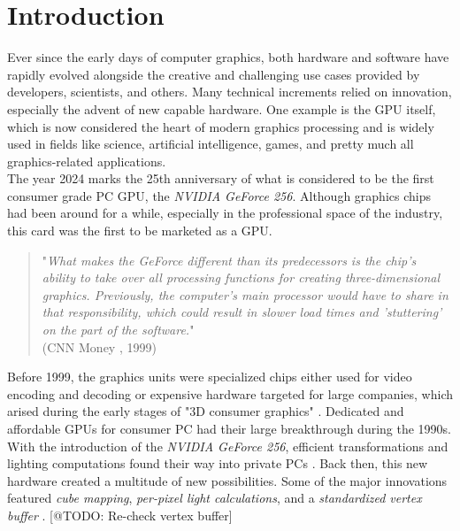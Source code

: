 \chapter{Introduction} \label{cpt-introduction}

Ever since the early days of computer graphics, both hardware and software have rapidly evolved
alongside the creative and challenging use cases provided by developers, scientists, and others.
Many technical increments relied on innovation, especially the advent of new capable hardware.
One example is the \ac{GPU} itself, which is now considered the heart of modern graphics 
processing and is widely used in fields like science, artificial intelligence, games, and pretty 
much all graphics-related applications. \\

\noindent
The year 2024 marks the 25th anniversary of what is considered to be the first consumer grade PC 
\ac{GPU}, the \emph{NVIDIA GeForce 256}. Although graphics chips had been around for a while, 
especially in the professional space of the industry, this card was the first to be marketed 
as a \ac{GPU}. 

\begin{quote}
    "\emph{What makes the GeForce different than its predecessors is the chip's ability to take over all 
    processing functions for creating three-dimensional graphics. Previously, the computer's main 
    processor would have to share in that responsibility, which could result in slower load times 
    and 'stuttering' on the part of the software.}" \\  
    (CNN Money \cite{CNNMoney1999}, 1999)
\end{quote}

\noindent
Before 1999, the graphics units were specialized chips either used for video encoding and decoding
or expensive hardware targeted for large companies, which arised during the early stages of "3D 
consumer graphics" \cite{Singer2023}. Dedicated and affordable \ac{GPU}s for consumer \ac{PC} had 
their large breakthrough during the 1990s. With the introduction of the \emph{NVIDIA GeForce 256}, 
efficient transformations and lighting computations found their way into private \ac{PC}s 
\cite{Fenno2024}. Back then, this new hardware created a multitude of new possibilities. Some of the 
major innovations featured \emph{cube mapping}, \emph{per-pixel light calculations}, and a 
\emph{standardized vertex buffer} \cite{NVIDIA1999, Battaglia2024}. [@TODO: Re-check vertex buffer] \\

